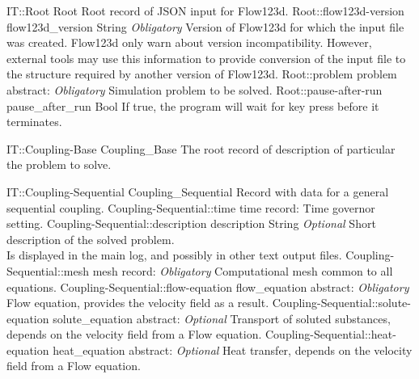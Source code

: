 \begin{RecordType}
	{IT::Root}
	{Root}
	{}%
	{}%
	{{{Root record of JSON input for Flow123d.}%
}}
		\RecKey
			{Root::flow123d-version}
			{flow123d{\_}version}
			{{String}}{}
			{ \it{Obligatory}}
			{{{Version of Flow123d for which the input file was created.
Flow123d only warn about version incompatibility.
However, external tools may use this information to provide conversion of the input file to the structure required by another version of Flow123d.}%
}}
		\RecKey
			{Root::problem}
			{problem}
			{{abstract: }}{}
			{ \it{Obligatory}}
			{{{Simulation problem to be solved.}%
}}
		\RecKey
			{Root::pause-after-run}
			{pause{\_}after{\_}run}
			{{Bool}}{}
			{ }
			{{{If true, the program will wait for key press before it terminates.}%
}}
\end{RecordType}
\begin{AbstractType}
	{IT::Coupling-Base}
	{Coupling{\_}Base}
	{}
	{{{The root record of description of particular the problem to solve.}%
}}
\end{AbstractType}
\begin{RecordType}
	{IT::Coupling-Sequential}
	{Coupling{\_}Sequential}
	{}%
	{}%
	{{{Record with data for a general sequential coupling.}%
}}
		\RecKey
			{Coupling-Sequential::time}
			{time}
			{{record: }}{}
			{ \ValueDefault{{\{}{\}}}}
			{{{Time governor setting.}%
}}
		\RecKey
			{Coupling-Sequential::description}
			{description}
			{{String}}{}
			{ \it{Optional}}
			{{{Short description of the solved problem.}\\{
Is displayed in the main log, and possibly in other text output files.}%
}}
		\RecKey
			{Coupling-Sequential::mesh}
			{mesh}
			{{record: }}{}
			{ \it{Obligatory}}
			{{{Computational mesh common to all equations.}%
}}
		\RecKey
			{Coupling-Sequential::flow-equation}
			{flow{\_}equation}
			{{abstract: }}{}
			{ \it{Obligatory}}
			{{{Flow equation, provides the velocity field as a result.}%
}}
		\RecKey
			{Coupling-Sequential::solute-equation}
			{solute{\_}equation}
			{{abstract: }}{}
			{ \it{Optional}}
			{{{Transport of soluted substances, depends on the velocity field from a Flow equation.}%
}}
		\RecKey
			{Coupling-Sequential::heat-equation}
			{heat{\_}equation}
			{{abstract: }}{}
			{ \it{Optional}}
			{{{Heat transfer, depends on the velocity field from a Flow equation.}%
}}
\end{RecordType}
